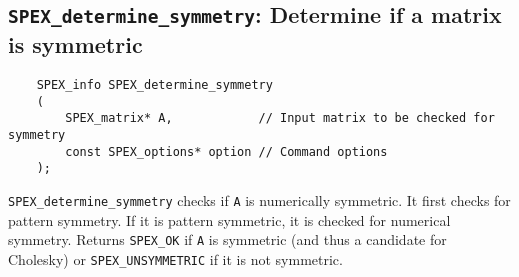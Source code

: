 \documentclass[12pt]{report}
\theoremstyle{definition}
\begin{document}
\subsection{\texttt{SPEX\_determine\_symmetry}: Determine if a matrix is symmetric}

\begin{mdframed}[userdefinedwidth=6in]
{\footnotesize
\begin{verbatim}
    SPEX_info SPEX_determine_symmetry
    (
        SPEX_matrix* A,            // Input matrix to be checked for symmetry
        const SPEX_options* option // Command options
    ); 
\end{verbatim}
} \end{mdframed}

\verb|SPEX_determine_symmetry| checks if \verb|A| is numerically symmetric. It first checks for pattern symmetry. If it is pattern symmetric, it is checked for numerical symmetry. Returns \verb|SPEX_OK| if \verb|A| is symmetric (and thus a candidate for Cholesky) or \verb|SPEX_UNSYMMETRIC| if it is not symmetric.




\end{document}
